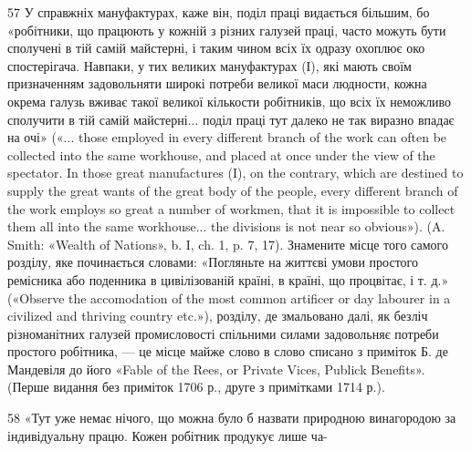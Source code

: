 57 У справжніх мануфактурах, каже він, поділ праці видається
більшим, бо «робітники, що працюють у кожній з різних галузей праці,
часто можуть бути сполучені в тій самій майстерні, і таким чином всіх
їх одразу охоплює око спостерігача. Навпаки, у тих великих мануфактурах
(І), які мають своїм призначенням задовольняти широкі потреби
великої маси людности, кожна окрема галузь вживає такої великої кількости
робітників, що всіх їх неможливо сполучити в тій самій майстерні...
поділ праці тут далеко не так виразно впадає на очі» («... those employed
in every different branch of the work can often be collected into the
same workhouse, and placed at once under the view of the spectator. In
those great manufactures (I), on the contrary, which are destined to supply
the great wants of the great body of the people, every different branch of
the work employs so great a number of workmen, that it is impossible
to collect them all into the same workhouse... the divisions is not near
so obvious»). (A. Smith: «Wealth of Nations», b. I, ch. 1, p. 7, 17).
Знамените місце того самого розділу, яке починається словами:
«Погляньте на життєві умови простого ремісника або поденника в
цивілізованій країні, в країні, що процвітає, і т. д.» («Observe the accomodation
of the most common artificer or day labourer in a civilized and
thriving country etc.»), розділу, де змальовано далі, як безліч різноманітних
галузей промисловості спільними силами задовольняє потреби
простого робітника, — це місце майже слово в слово списано з приміток
Б. де Мандевіля до його «Fable of the Rees, or Private Vices, Publick Benefits».
(Перше видання без приміток 1706 р., друге з примітками 1714 р.).

58 «Тут уже немає нічого, що можна було б назвати природною винагородою
за індивідуальну працю. Кожен робітник продукує лише ча-
